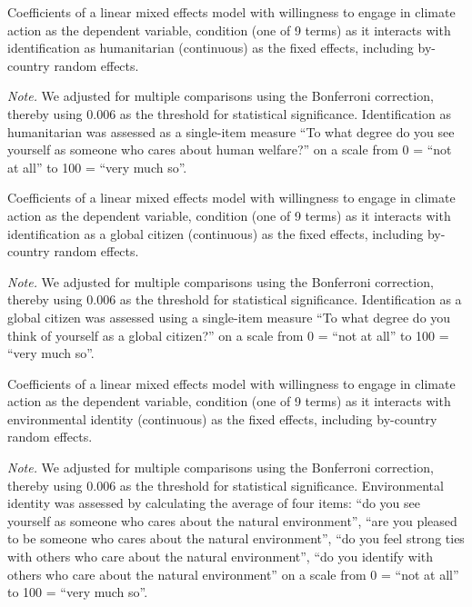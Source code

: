 \begin{table}[H] 
\caption{Coefficients of a linear mixed effects model with willingness to engage in climate action as the dependent variable, condition (one of 9 terms) as it interacts with identification as humanitarian (continuous) as the fixed effects, including by-country random effects.}
 
\end{table}
\textit{Note.} We adjusted for multiple comparisons using the Bonferroni correction, thereby using 0.006 as the threshold for statistical significance. Identification as humanitarian was assessed as a single-item measure “To what degree do you see yourself as someone who cares about human welfare?” on a scale from 0 = “not at all” to 100 = “very much so”.

\begin{table}[H] 
\caption{Coefficients of a linear mixed effects model with willingness to engage in climate action as the dependent variable, condition (one of 9 terms) as it interacts with identification as a global citizen (continuous) as the fixed effects, including by-country random effects.}
 
\end{table}
\textit{Note.} We adjusted for multiple comparisons using the Bonferroni correction, thereby using 0.006 as the threshold for statistical significance. Identification as a global citizen was assessed using a single-item measure “To what degree do you think of yourself as a global citizen?” on a scale from 0 = “not at all” to 100 = “very much so”.

\begin{table}[H] 
\caption{Coefficients of a linear mixed effects model with willingness to engage in climate action as the dependent variable, condition (one of 9 terms) as it interacts with environmental identity (continuous) as the fixed effects, including by-country random effects.}
 
\end{table}
\textit{Note.} We adjusted for multiple comparisons using the Bonferroni correction, thereby using 0.006 as the threshold for statistical significance. Environmental identity was assessed by calculating the average of four items: “do you see yourself as someone who cares about the natural environment”, “are you pleased to be someone who cares about the natural environment”, “do you feel strong ties with others who care about the natural environment”, “do you identify with others who care about the natural environment” on a scale from 0 = “not at all” to 100 = “very much so”.

